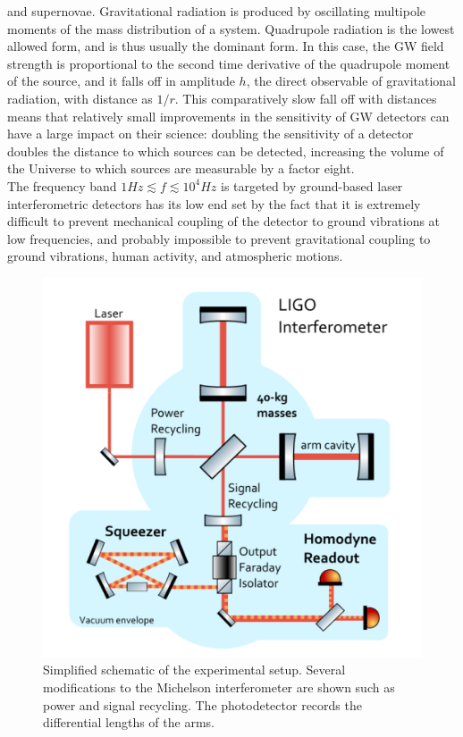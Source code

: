 \documentclass[binding=0.6cm, LaM]{sapthesis}
\begin{document}
        and supernovae.
 	Gravitational radiation is produced by oscillating multipole moments of the mass distribution of a system.
        Quadrupole radiation is the lowest allowed form, and is thus usually the dominant form.
        In this case, the GW field strength is proportional to the second time derivative of the quadrupole moment of the source,
        and it falls off in amplitude $h$, the direct observable of gravitational radiation, with distance as $1/r$.
        This comparatively slow fall off with distances means that relatively small improvements in the sensitivity
        of GW detectors can have a large impact on their science:
        doubling the sensitivity of a detector doubles the distance to which sources can be detected,
        increasing the volume of the Universe to which sources are measurable by a factor eight. \\
	The frequency band $1Hz \apprle f \apprle 10^4 Hz$ is targeted by
        ground-based laser interferometric detectors has its low end set by the fact that it is extremely difficult
        to prevent mechanical coupling of the detector to ground vibrations at low frequencies,
        and probably impossible to prevent gravitational coupling to ground vibrations, human activity, and atmospheric motions.
    \begin{figure}[H]
                \includegraphics[scale=0.5]{interferometer}
                \centering
                \caption{Simplified schematic of the experimental setup. Several modifications to the Michelson interferometer are shown such as power and signal recycling. The photodetector records the differential lengths of the arms. \cite{9}}
                \label{fig:interferometer}
                \end{figure}
\end{document}
